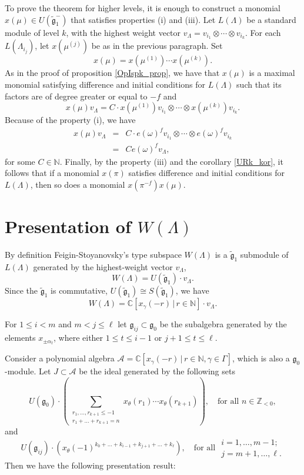 \documentclass[a4paper, 10pt,oneside]{amsart}
\begin{document}
To prove the theorem for higher levels, it is enough to construct a monomial
$x(\mu)\in U({\tilde{{\mathfrak g}}}_1^-)$ that satisfies properties (i) and (iii).
Let $L(\Lambda)$ be a standard module of level $k$, with the highest
weight vector $v_\Lambda=v_{i_1}\otimes\cdots\otimes v_{i_k}$.
For each $L(\Lambda_{i_j})$, let $x(\mu^{(j)})$ be as in the previous paragraph.
Set
$$x(\mu)=x(\mu^{(1)})\cdots x(\mu^{(k)}).$$
As in the proof of proposition \ref{OpIspk_prop}, we have that
$x(\mu)$ is a maximal monomial satisfying difference and initial conditions for $L(\Lambda)$ such that its
factors are of degree greater or equal to $-f$ and
$$ x(\mu)v_\Lambda = C\cdot x(\mu^{(1)})v_{i_1}\otimes\cdots\otimes x(\mu^{(k)})v_{i_k}. $$
Because of the property (i), we have
\begin{eqnarray*}
  x(\mu)v_\Lambda & = & C \cdot e(\omega)^f v_{i_1}\otimes\cdots\otimes e(\omega)^f v_{i_k}\\
 & = & C e(\omega)^f v_\Lambda,
\end{eqnarray*}
for some $C\in{{\mathbb N}}$. Finally, by the property (iii) and the corollary \ref{URk_kor}, it follows that if a monomial $x(\pi)$
satisfies difference  and initial conditions for $L(\Lambda)$, then so does a monomial $x(\pi^{-f})x(\mu)$.

\section{Presentation of $W(\Lambda)$}

\label{Prez_pogl}

By definition Feigin-Stoyanovsky's type subspace $W(\Lambda)$ is a ${\tilde{{\mathfrak g}}}_1$ submodule of $L(\Lambda)$ generated by the highest-weight vector $v_\Lambda$,
$$W(\Lambda)=U({\tilde{{\mathfrak g}}}_1)\cdot v_\Lambda.$$
Since the ${\tilde{{\mathfrak g}}}_1$ is commutative,
$U({\tilde{{\mathfrak g}}}_1)\cong S({\tilde{{\mathfrak g}}}_1)$, we have
$$W(\Lambda)={{\mathbb C}}[x_\gamma(-r)\,|\,r\in{{\mathbb N}}]\cdot v_\Lambda.$$

For $1\leq i <m$ and $m<j\leq\ell$ let ${{\mathfrak g}}_{ij}\subset {{\mathfrak g}}_0$
be the subalgebra generated by the elements $x_{\pm\alpha_t}$, where
either $1\leq t \leq i-1$ or $j+1\leq t \leq\ell$.

Consider a polynomial algebra $\mathcal{A}={{\mathbb C}}[x_\gamma(-r)\,|\,r\in{{\mathbb N}},\gamma\in\Gamma]$,
which is also a ${{\mathfrak g}}_0$-module. Let $J\subset\mathcal{A}$ be the ideal generated by the following sets
$$U({{\mathfrak g}}_0)\cdot\left(\sum_{\substack{r_1,\dots,r_{k+1}\leq -1 \\ r_1+\dots+r_{k+1}=n}}x_\theta(r_1)\cdots x_\theta(r_{k+1})\right),\quad \textrm{for all\ }n\in {{\mathbb Z}}_{<0},$$
and $$ U({{\mathfrak g}}_{ij})\cdot
\left(x_\theta(-1)^{k_0+\dots+k_{i-1}+k_{j+1}+\dots+k_\ell}\right),\quad
\textrm{for all\ } \begin{array}{l} i=1,\dots,m-1;\\
j=m+1,\dots,\ell.\end{array}$$
Then we have the following presentation result:
\end{document}
